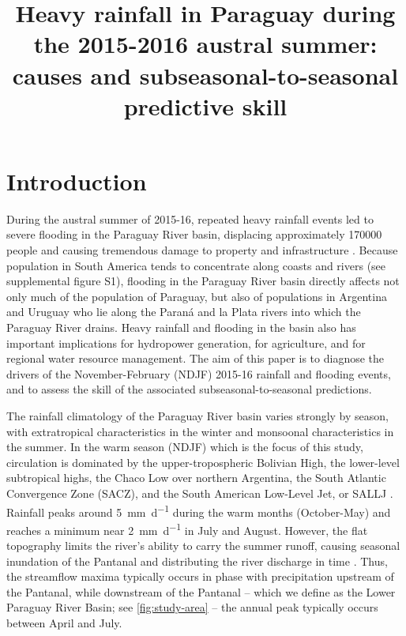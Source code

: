 \documentclass{ametsoc}
\title{Heavy rainfall in Paraguay during the 2015-2016 austral summer: causes and subseasonal-to-seasonal predictive skill}
\affiliation{Columbia Water Center. Dept. of Earth and Environmental Engineering, Columbia University, 500 W. 120th St., New York, NY. USA \\ Columbia Water Center, Columbia University, 500 W. 120th St., New York, NY. USA}
\begin{document}
\maketitle

\section{Introduction}

During the austral summer of 2015-16, repeated heavy rainfall events led to severe flooding in the Paraguay River basin, displacing approximately \num{170000} people \citep{BrackenridgeDFO} and causing tremendous damage to property and infrastructure \citep{MinisteriodeObrasPublicasyComunicacion:2016tq}.
Because population in South America tends to concentrate along coasts and rivers (see supplemental figure S1), flooding in the Paraguay River basin directly affects not only much of the population of Paraguay, but also of populations in Argentina and Uruguay who lie along the Paran\'{a} and la Plata rivers into which the Paraguay River drains.
Heavy rainfall and flooding in the basin also has important implications for hydropower generation, for agriculture, and for regional water resource management.
The aim of this paper is to diagnose the drivers of the November-February (NDJF) 2015-16 rainfall and flooding events, and to assess the skill of the associated subseasonal-to-seasonal predictions.

The rainfall climatology of the Paraguay River basin varies strongly by season, with extratropical characteristics in the winter and monsoonal characteristics in the summer.
In the warm season (NDJF) which is the focus of this study, circulation is dominated by the upper-tropospheric Bolivian High, the lower-level subtropical highs, the Chaco Low over northern Argentina, the South Atlantic Convergence Zone (SACZ), and the South American Low-Level Jet, or SALLJ \citep{Grimm2009,Marengo:2012cm}.
Rainfall peaks around \SI{5}{\milli\meter\per\day} during the warm months (October-May) and reaches a minimum near \SI{2}{\milli\meter\per\day} in July and August.
However, the flat topography limits the river's ability to carry the summer runoff, causing seasonal inundation of the Pantanal and distributing the river discharge in time \citep{Bravo:2011et,Barros:2004bn}.
Thus, the streamflow maxima typically occurs in phase with precipitation upstream of the Pantanal, while downstream of the Pantanal -- which we define as the Lower Paraguay River Basin; see \cref{fig:study-area} -- the annual peak typically occurs between April and July.
\end{document}
